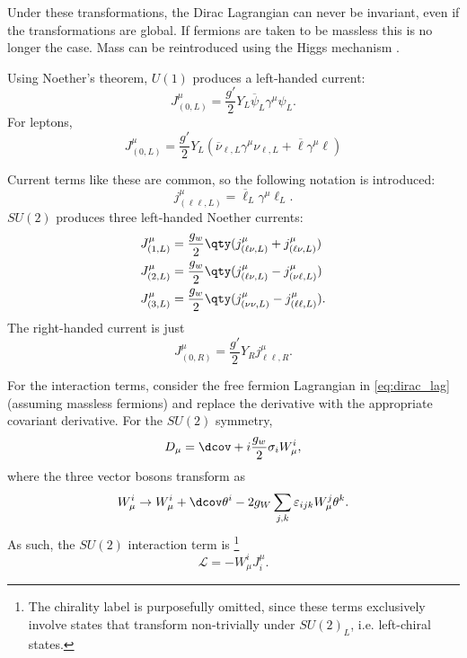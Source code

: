 Under these transformations, the Dirac Lagrangian can never be invariant, even if the transformations are global. If  fermions are taken to be massless this is no longer the case. Mass can be reintroduced using the Higgs mechanism \cite{goldberg_standard_2017}.

Using Noether's theorem, $U(1)$ produces a left-handed current:
\begin{equation}
    J^{\mu}_{(0,L)} = \frac{g'}{2}Y_L\overline{\psi}_L\gamma^\mu\psi_L.
\end{equation}
For leptons,
\begin{equation}
    J^{\mu}_{(0,L)} = \frac{g'}{2}Y_L(\overline{\nu}_{\ell,L}\gamma^{\mu}\nu_{\ell,L}+\overline{\ell}\gamma^{\mu} \ell)
\end{equation}

Current terms like these are common, so the following notation is introduced:
\begin{equation}
    j^{\mu}_{(\ell\ell,L)} = \overline{\ell}_L\gamma^\mu \ell_L.
\end{equation}
$SU(2)$ produces three left-handed Noether currents:
\begin{align}
    J^{\mu}_{(1,L)} &= \frac{g_w}{2}\qty(j^{\mu}_{(\ell\nu,L)}+j^{\mu}_{(\ell\nu,L)})\\
    J^{\mu}_{(2,L)} &= \frac{g_w}{2}\qty(j^{\mu}_{(\ell\nu,L)}-j^{\mu}_{(\nu \ell,L)}) \\
    J^{\mu}_{(3,L)} &= \frac{g_w}{2}\qty(j^{\mu}_{(\nu\nu,L)}-j^{\mu}_{(\ell\ell,L)}).
\end{align}
The right-handed current is just 
\begin{equation}
    J_{(0,R)}^{\mu}=\frac{g'}{2}Y_Rj^{\mu}_{\ell\ell,R}.
\end{equation}

For the interaction terms, consider the free fermion Lagrangian in \eqref{eq:dirac_lag} (assuming massless fermions) and replace the derivative with the appropriate covariant derivative. For the $SU(2)$ symmetry,
\begin{equation}
    D_\mu = \dcov + i\frac{g_w}{2} \sigma_i W_\mu^{i},
\end{equation}
where the three vector bosons transform as
\begin{equation}
    W_{\mu}^{i} \rightarrow W_{\mu}^{i}+\dcov \theta^{i} - 2g_W \sum_{j,k} \varepsilon_{ijk} W_{\mu}^{j}\theta^{k}.
\end{equation}
As such, the $SU(2)$ interaction term is \footnote{The chirality label is purposefully omitted, since these terms exclusively involve states that transform non-trivially under $SU(2)_L$, i.e. left-chiral states.}
\begin{equation}
    \mathcal{L} = -W_{\mu}^{i} J_{i}^{\mu}.
\end{equation}

